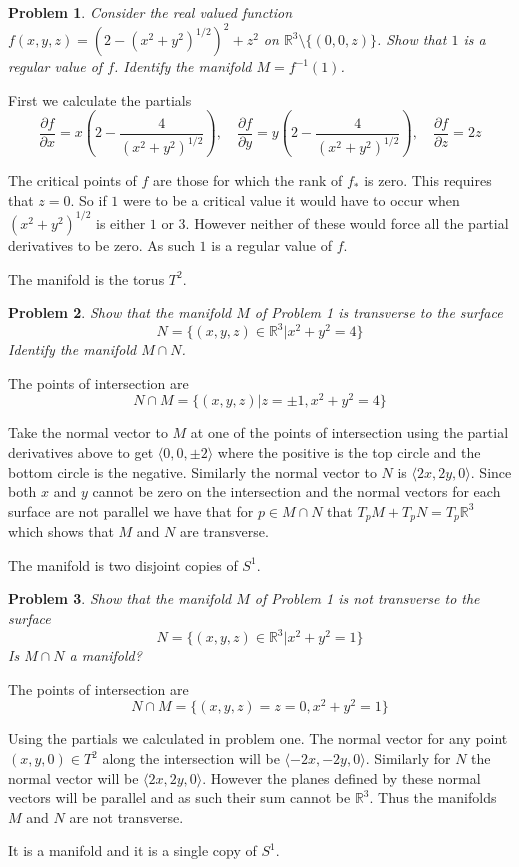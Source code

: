 \documentclass[10pt]{article}
\newcommand{\sk}{\vskip10mm}
\newcommand{\bb}[1]{\mathbb{#1}}
\theoremstyle{plain}
\newtheorem{problem}{Problem}
\theoremstyle{remark}
\begin{document}
\begin{problem}
  Consider the real valued function $f(x,y,z)=(2-(x^2+y^2)^{1/2})^2+z^2$
  on $\bb{R}^3\setminus\{(0,0,z)\}$. Show that $1$ is a regular value of $f$.
  Identify the manifold $M=f^{-1}(1)$.
\end{problem}

First we calculate the partials
\[
  \frac{\partial f}{\partial x}=x\left(2-\frac{4}{(x^2+y^2)^{1/2}}\right) ,
  \quad\frac{\partial f}{\partial y}=y\left(2-\frac{4}{(x^2+y^2)^{1/2}}\right) ,
  \quad\frac{\partial f}{\partial z}= 2z 
\]

The critical points of $f$ are those for which the rank of $f_*$ is zero. This
requires that $z=0$. So if $1$ were to be a critical value it would have
to occur when $(x^2+y^2)^{1/2}$ is either $1$ or $3$. However neither of these would
force all the partial derivatives to be zero. As such $1$ is a regular value of $f$.

The manifold is the torus $T^2$.

\sk

\begin{problem}
  Show that the manifold $M$ of Problem 1 is transverse to the surface
  \[
    N=\{(x,y,z)\in\bb{R}^3|x^2+y^2=4\}
  \]
  Identify the manifold $M\cap N$.
\end{problem}

The points of intersection are
\[
  N\cap M = \{(x,y,z)|z=\pm 1, x^2+y^2=4\}
\]

Take the normal vector to $M$ at one of the points of intersection using
the partial derivatives above to get $\langle 0,0,\pm 2\rangle$ where the positive is
the top circle and the bottom circle is the negative. Similarly the normal
vector to $N$ is $\langle 2x,2y,0\rangle$. Since both $x$ and $y$ cannot be zero on the
intersection and the normal vectors for each surface are not parallel
we have that for $p\in M\cap N$ that $T_p M+T_p N=T_p\bb{R}^3$ which shows
that $M$ and $N$ are transverse.


The manifold is two disjoint copies of $S^1$.
\sk

\begin{problem}
  Show that the manifold $M$ of Problem 1 is not transverse to the surface
  \[
    N=\{(x,y,z)\in\bb{R}^3|x^2+y^2=1\}
  \]
  Is $M\cap N$ a manifold?
\end{problem}

The points of intersection are
\[
  N\cap M = \{(x,y,z)=z=0,x^2+y^2=1\}
\]

Using the partials we calculated in problem one. The normal vector for
any point $(x,y,0)\in T^2$ along the intersection will be $\langle-2x,-2y,0 \rangle$.
Similarly for $N$ the normal vector will be $\langle 2x,2y,0\rangle$. However the
planes defined by these normal vectors will be parallel and as such their
sum cannot be $\bb{R}^3$. Thus the manifolds $M$ and $N$ are not transverse.

It is a manifold and it is a single copy of $S^1$.

\end{document}

